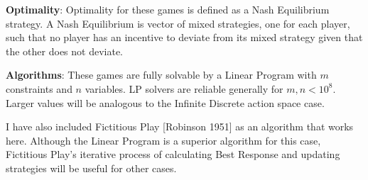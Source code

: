\documentclass[a4paper,12pt]{article}
\begin{document}
\textbf{Optimality}: Optimality for these games is defined as a Nash Equilibrium strategy. A Nash Equilibrium is vector of mixed strategies, one for each player, such that no player has an incentive to deviate from its mixed strategy given that the other does not deviate. 

\textbf{Algorithms}: These games are fully solvable by a Linear Program with $m$ constraints and $n$ variables. LP solvers are reliable generally for $m, n < 10^8$. Larger values will be analogous to the Infinite Discrete action space case. 

I have also included Fictitious Play [Robinson 1951] as an algorithm that works here. Although the Linear Program is a superior algorithm for this case, Fictitious Play's iterative process of calculating Best Response and updating strategies will be useful for other cases.
\end{document}
